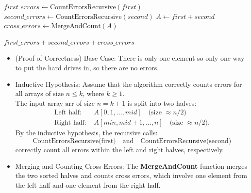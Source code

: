 \documentclass[12pt, letterpaper]{article}
\theoremstyle{definition}
\begin{document}
\begin{enumerate}[(a)]
\begin{algorithm}
\begin{algorithmic}[1]
                \State $first\_errors \gets \text{CountErrorsRecursive}(first)$
                \State $second\_errors \gets \text{CountErrorsRecursive}(second)$
                \State $A \gets first+second$ 
                \State $cross\_errors \gets \text{MergeAndCount}(A)$
                
                \State \Return $first\_errors + second\_errors + cross\_errors$
            \EndFunction
            \end{algorithmic}
            \end{algorithm}
            \begin{itemize}
                \item (Proof of Correctness) Base Case:
                There is only one element so only one way to put the hard drives in, so there are no errors.
                \item Inductive Hypothesis:
                Assume that the algorithm correctly counts errors for all arrays of size $n \leq k$, where $k \geq 1$.\\
                The input array $\text{arr}$ of size $n = k+1$ is split into two halves:
                \begin{align*}
                    \text{Left half: } & A[0,1,\dots,mid] \quad \text{(size } \approx n/2 \text{)} \\
                    \text{Right half: } & A[min,mid+1,\dots,n] \quad \text{(size } \approx n/2\text{)}.
                \end{align*}
                By the inductive hypothesis, the recursive calls:
                \[
                \text{CountErrorsRecursive(first)} \quad \text{and} \quad \text{CountErrorsRecursive(second)}
                \]
                correctly count all errors within the left and right halves, respectively.

                \item Merging and Counting Cross Errors:
                The \textbf{MergeAndCount} function merges the two sorted halves and counts cross errors, which involve one element from the left half and one element from the right half. 


\end{itemize}
\end{enumerate}
\end{document}
